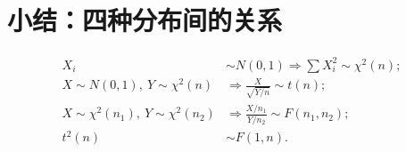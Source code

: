 \section*{小结：四种分布间的关系}
\[
      \boxed{
            \begin{aligned}
                  X_i                                & \sim N(0,1) \Rightarrow \sum X_i^2 \sim \chi^2(n); \\[3pt]
                  X\sim N(0,1),~Y\sim\chi^2(n)       & \Rightarrow \frac{X}{\sqrt{Y/n}}\sim t(n);         \\[3pt]
                  X\sim\chi^2(n_1),~Y\sim\chi^2(n_2) & \Rightarrow \frac{X/n_1}{Y/n_2}\sim F(n_1,n_2);    \\[3pt]
                  t^2(n)                             & \sim F(1,n).
            \end{aligned}
      }
\]